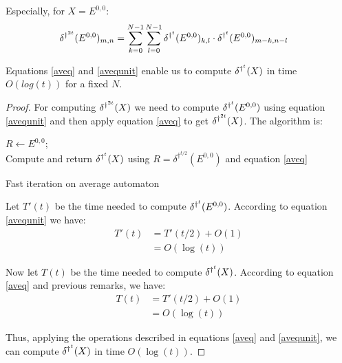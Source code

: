 Especially, for $X = E^{0,0}$:
\begin{equation}
 \label{avequnit}
 \begin{split}
    \delta^{\dag^{2t}} (E^{0,0})_{m,n} & = \sum_{k=0}^{N-1} \sum_{l=0}^{N-1} \delta^{\dag^t} (E^{0,0})_{k,l} \cdot \delta^{\dag^t} (E^{0,0})_{m-k,n-l}
 \end{split}
\end{equation}

\begin{prop}
 Equations \ref{aveq} and \ref{avequnit} enable us to compute $\delta^{\dag^t}(X)$ in time $O(log(t))$ for a fixed $N$.
\end{prop}

\begin{proof}
For computing $\delta^{\dag^{2t}}(X)$ we need to compute $\delta^{\dag^t}(E^{0,0})$ using equation \ref{avequnit} and then apply equation \ref{aveq} to get $\delta^{\dag^{2t}}(X)$. The algorithm is:

\begin{algorithm}[H]
    \DontPrintSemicolon
    \LinesNotNumbered
        $R \leftarrow E^{0,0}$; \\
        Compute and return $\delta^{\dag^t}(X)$ using $R = \delta^{\dag^{t/2}}(E^{0,0})$ and equation \ref{aveq}
\caption{Fast iteration on average automaton\label{algoq5}}
\end{algorithm}

 Let $T'(t)$ be the time needed to compute $\delta^{\dag^t}(E^{0,0})$. According to equation \ref{avequnit} we have:
 \[\begin{split}
    T'(t) & = T'(t/2) + O(1) \\
         & = O(\log(t))
   \end{split}
\]
 
 Now let $T(t)$ be the time needed to compute $\delta^{\dag^t}(X)$. According to equation \ref{aveq} and previous remarks, we have:
 \[\begin{split}
    T(t) & = T'(t/2) + O(1) \\
	 & = O(\log(t))
   \end{split}
\]
 
 Thus, applying the operations described in equations \ref{aveq} and \ref{avequnit}, we can compute $\delta^{\dag^t}(X)$ in time $O(\log(t))$. 
\end{proof}

